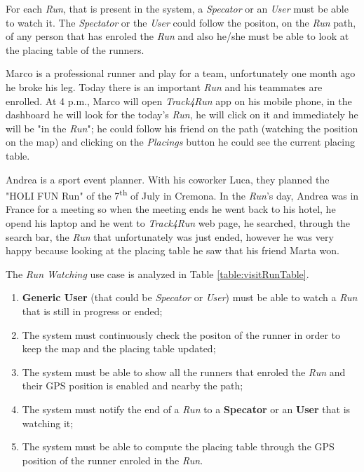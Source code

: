 For each \textit{Run}, that is present in the system, a \textit{Specator} or an \textit{User} must be able to watch it. The \textit{Spectator} or the \textit{User} could follow the positon, on the \textit{Run} path, of any person that has enroled the \textit{Run} and also he/she must be able to look at the placing table of the runners.

Marco is a professional runner and play for a team, unfortunately one month ago he broke his leg. Today there is an important \textit{Run} and his teammates are enrolled. At 4 p.m., Marco will open \textit{Track4Run} app on his mobile phone, in the dashboard he will look for the today's \textit{Run}, he will click on it and immediately he will be "in the \textit{Run}"; he could follow his friend on the path (watching the position on the map) and clicking on the \textit{Placings} button he could see the current placing table.

Andrea is a sport event planner. With his coworker Luca, they planned the "HOLI FUN Run" of the 7\textsuperscript{th} of July in Cremona. In the \textit{Run}'s day, Andrea was in France for a meeting so when the meeting ends he went back to his hotel, he opend his laptop and he went to \textit{Track4Run} web page, he searched, through the search bar, the \textit{Run} that unfortunately was just ended, however he was very happy because looking at the placing table he saw that his friend Marta won.

The \textit{Run Watching} use case is analyzed in Table \ref{table:visitRunTable}.

\begin{enumerate}
  \item \textbf{Generic User} (that could be \textit{Specator} or \textit{User}) must be able to watch a \textit{Run} that is still in progress or ended;
  \item The system must continuously check the positon of the runner in order to keep the map and the placing table updated;
  \item The system must be able to show all the runners that enroled the \textit{Run} and their GPS position is enabled and nearby the path;
  \item The system must notify the end of a \textit{Run} to a \textbf{Specator} or an \textbf{User} that is watching it;
  \item The system must be able to compute the placing table through the GPS position of the runner enroled in the \textit{Run}.
\end{enumerate}

